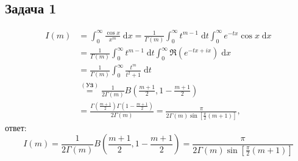 \def \picdir{pic/}

\subsection*{Задача 1}
\begin{align*}
  I(m) &= \int_{0}^{\infty} \frac{\cos{x}}{x^m}\; \mathrm{d} x = \frac{1}{\Gamma(m)}\int_{0}^{\infty} t^{m-1}\; \mathrm{d} t \int_{0}^{\infty} e^{-tx}\cos{x}\; \mathrm{d} x\\
       &= \frac{1}{\Gamma(m)}\int_{0}^{\infty} t^{m-1}\; \mathrm{d} t \int_{0}^{\infty} \Re\left(e^{-tx+ix}\right)\; \mathrm{d} x\\
       &= \frac{1}{\Gamma(m)}\int_{0}^{\infty}  \frac{t^m}{t^2+1}\; \mathrm{d} t\\
       &\overset{(\textbf{У3})}{=} \frac{1}{2 \Gamma(m)} B \left(\frac{m+1}{2}, 1-\frac{m+1}{2} \right)\\
       &= \frac{\Gamma\left(\frac{m+1}{2}\right)\Gamma\left(1-\frac{m+1}{2}\right)}{2 \Gamma(m)} = \frac{\pi}{2 \Gamma(m)\sin{\left[\frac{\pi}{2}(m+1)\right]}},
\end{align*}
ответ:
\begin{equation*}
  \boxed{I(m) = \frac{1}{2 \Gamma(m)} B \left(\frac{m+1}{2}, 1-\frac{m+1}{2} \right) = \frac{\pi}{2 \Gamma(m)\sin{\left[\frac{\pi}{2}(m+1)\right]}}}
\end{equation*}